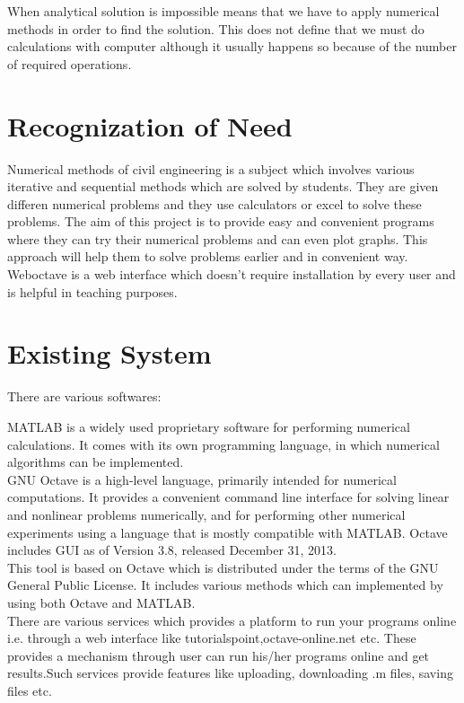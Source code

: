 \noindent When analytical solution is impossible means that we have to apply numerical methods in order to find the solution. This does not define that we must do calculations with computer although it usually happens so because of the number of required operations.
 \section{Recognization of Need}
 Numerical methods of civil engineering is a subject which involves various iterative and sequential methods which are solved by students. They are given differen numerical problems and they use calculators or excel to solve these problems. The aim of this project is to provide easy and convenient programs where they can try their numerical problems and can even plot graphs.
This approach will help them to solve problems earlier and in convenient way.\\
Weboctave is a web interface which doesn't require installation by every user and is helpful in teaching purposes.
\section{Existing System}

There are various softwares:

MATLAB is a widely used proprietary software for performing numerical calculations. It comes with its own programming language, in which numerical algorithms can be implemented.\\

GNU Octave is a high-level language, primarily intended for numerical computations. It provides a convenient command line interface for solving linear and nonlinear problems numerically, and for performing other numerical experiments using a language that is mostly compatible with MATLAB. Octave includes GUI as of Version 3.8, released December 31, 2013.\\

This tool is based on Octave which is distributed under the terms of the GNU General Public License. It includes various methods which can implemented by using both Octave and MATLAB.\\

There are various services which provides a platform to run your programs online i.e. through a web interface like tutorialspoint,octave-online.net etc.
These provides a mechanism through user can run his/her programs online and get results.Such services provide features like uploading, downloading .m files, saving files etc.

